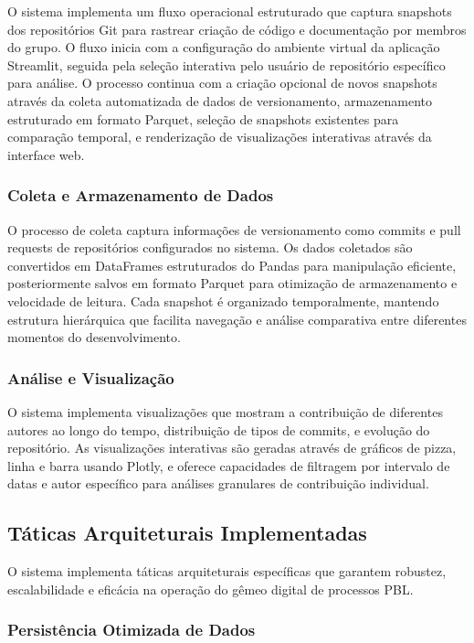 \documentclass[12pt,a4paper]{article}
\begin{document}
O sistema implementa um fluxo operacional estruturado que captura snapshots dos repositórios Git para rastrear criação de código e documentação por membros do grupo. O fluxo inicia com a configuração do ambiente virtual da aplicação Streamlit, seguida pela seleção interativa pelo usuário de repositório específico para análise. O processo continua com a criação opcional de novos snapshots através da coleta automatizada de dados de versionamento, armazenamento estruturado em formato Parquet, seleção de snapshots existentes para comparação temporal, e renderização de visualizações interativas através da interface web.

\subsubsection{Coleta e Armazenamento de Dados}

O processo de coleta captura informações de versionamento como commits e pull requests de repositórios configurados no sistema. Os dados coletados são convertidos em DataFrames estruturados do Pandas para manipulação eficiente, posteriormente salvos em formato Parquet para otimização de armazenamento e velocidade de leitura. Cada snapshot é organizado temporalmente, mantendo estrutura hierárquica que facilita navegação e análise comparativa entre diferentes momentos do desenvolvimento.

\subsubsection{Análise e Visualização}

O sistema implementa visualizações que mostram a contribuição de diferentes autores ao longo do tempo, distribuição de tipos de commits, e evolução do repositório. As visualizações interativas são geradas através de gráficos de pizza, linha e barra usando Plotly, e oferece capacidades de filtragem por intervalo de datas e autor específico para análises granulares de contribuição individual.

\subsection{Táticas Arquiteturais Implementadas}

O sistema implementa táticas arquiteturais específicas que garantem robustez, escalabilidade e eficácia na operação do gêmeo digital de processos PBL.

\subsubsection{Persistência Otimizada de Dados}
\end{document}
